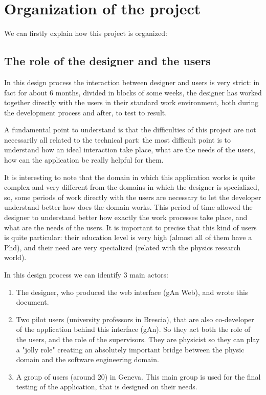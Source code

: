 
\chapter{Organization of the project} %

\label{Chapter2} %


We can firstly explain how this project is organized:

\section{The role of the designer and the users}
In this design process the interaction between designer and users is very strict: in fact for about 6 months, divided in blocks of some weeks, the designer has worked together directly with the users in their standard work environment, both during the development process and after, to test to result. 

A fundamental point to understand is that the difficulties of this project are not necessarily all related to the technical part: the most difficult point is to understand how an ideal interaction take place, what are the needs of the users, how can the application be really helpful for them.
 
It is interesting to note that the domain in which this application works is quite complex and very different from the domains in which the designer is specialized, so, some periods of work directly with the users are necessary to let the developer understand better how does the domain works.
This period of time allowed the designer to understand better how exactly the work processes take place, and what are the needs of the users. 
It is important to precise that this kind of users is quite particular: their education level is very high (almost all of them have a Phd), and their need are very specialized (related with the physics research world).

In this design process we can identify 3 main actors: 
\begin{enumerate}

\item
The designer, who produced the web interface (gAn Web), and wrote this document.

\item 
Two pilot users (university professors in Brescia), that are also co-developer of the application behind this interface (gAn). So they act both the role of the users, and the role of the supervisors. They are physicist so they can play a "jolly role" creating an absolutely important bridge between the physic domain and the software engineering domain. 

\item A group of users (around 20) in Geneva. This main group is used for the final testing of the application, that is designed on their needs.
 
\end{enumerate}

